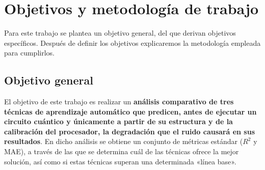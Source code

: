 \chapter{Objetivos y metodología de trabajo}
\label{cap:objetivos}

%
%
%
%

Para este trabajo se plantea un objetivo general, del que derivan objetivos
específicos. Después de definir los objetivos explicaremos la metodología empleada
para cumplirlos.

\section{Objetivo general}
\label{sec:objetivo_general}

El objetivo de este trabajo es realizar un \textbf{análisis comparativo de tres
técnicas de aprendizaje automático que predicen, antes de ejecutar un circuito cuántico y únicamente a
partir de su estructura y de la calibración del procesador, la degradación que el
ruido causará en sus resultados}. En dicho análisis se obtiene un conjunto de métricas
estándar ($R^2$ y MAE), a través de las que se determina cuál de las técnicas ofrece la
mejor solución, así como si estas técnicas superan una determinada «línea base».

